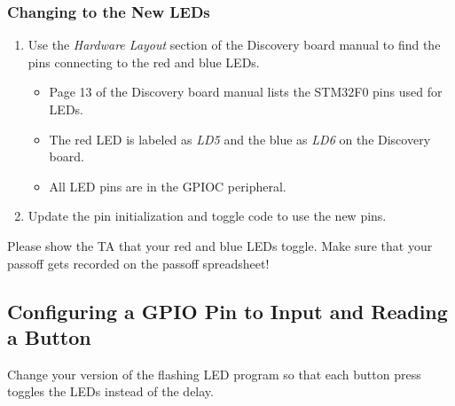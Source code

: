 \documentclass[openany,11pt,fleqn]{book} %
\begin{document}
\subsubsection{Changing to the New LEDs}

\begin{enumerate}
    \item Use the \textit{Hardware Layout} section of the Discovery board manual to find the pins connecting to the red and blue LEDs.  
    \begin{itemize}
        \item Page 13 of the Discovery board manual lists the STM32F0 pins used for LEDs.
        \item The red LED is labeled as \textit{LD5} and the blue as \textit{LD6} on the Discovery board.
        \item All LED pins are in the GPIOC peripheral. 
    \end{itemize}
    \item Update the pin initialization and toggle code to use the new pins.
\end{enumerate}

\begin{assignment}
	Please show the TA that your red and blue LEDs toggle. Make sure that your passoff gets recorded on the passoff spreadsheet!
\end{assignment}


\subsection{Configuring a GPIO Pin to Input and Reading a Button}

Change your version of the flashing LED program so that each button press toggles the LEDs instead of the delay.
\end{document}
